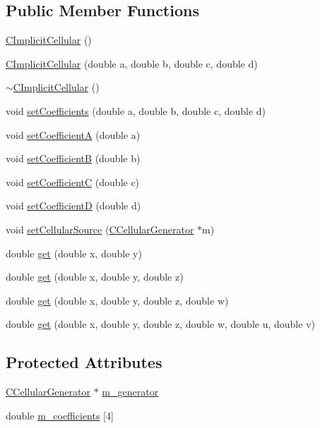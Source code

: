 \subsection*{Public Member Functions}
\begin{DoxyCompactItemize}
\item 
\hyperlink{classanl_1_1CImplicitCellular_a25da8b1ecdb5396f6e741bab08565b69}{CImplicitCellular} ()
\item 
\hyperlink{classanl_1_1CImplicitCellular_a1e754952ba8e132d394cfc2fa87dc048}{CImplicitCellular} (double a, double b, double c, double d)
\item 
\hyperlink{classanl_1_1CImplicitCellular_a59210b37300b9e5849e73ec834d21bc6}{$\sim$CImplicitCellular} ()
\item 
void \hyperlink{classanl_1_1CImplicitCellular_a7e73cf42aaaa4938e9b945beddee0357}{setCoefficients} (double a, double b, double c, double d)
\item 
void \hyperlink{classanl_1_1CImplicitCellular_a1ae398cefbc7591dc9848018aafd74f6}{setCoefficientA} (double a)
\item 
void \hyperlink{classanl_1_1CImplicitCellular_a3edf13d700a3855f1b40ad49e558a21e}{setCoefficientB} (double b)
\item 
void \hyperlink{classanl_1_1CImplicitCellular_aaf72b746ca8369b452c40a47d308415e}{setCoefficientC} (double c)
\item 
void \hyperlink{classanl_1_1CImplicitCellular_a6eeb2636ccb962cc1ff94f83dc53c8be}{setCoefficientD} (double d)
\item 
void \hyperlink{classanl_1_1CImplicitCellular_a646bdd9bebf686f8205b1da6d643a26c}{setCellularSource} (\hyperlink{classanl_1_1CCellularGenerator}{CCellularGenerator} $\ast$m)
\item 
double \hyperlink{classanl_1_1CImplicitCellular_aefb6e04efeb573a51112f1f27edef569}{get} (double x, double y)
\item 
double \hyperlink{classanl_1_1CImplicitCellular_aefaad448623f73921542503bc6ef898a}{get} (double x, double y, double z)
\item 
double \hyperlink{classanl_1_1CImplicitCellular_aaa7f9b16d76ba2fd6e8c1105ea76ba1e}{get} (double x, double y, double z, double w)
\item 
double \hyperlink{classanl_1_1CImplicitCellular_a0d5bebde497611f47083b97220ecffef}{get} (double x, double y, double z, double w, double u, double v)
\end{DoxyCompactItemize}
\subsection*{Protected Attributes}
\begin{DoxyCompactItemize}
\item 
\hyperlink{classanl_1_1CCellularGenerator}{CCellularGenerator} $\ast$ \hyperlink{classanl_1_1CImplicitCellular_a25b5b6d512c620bad24984dc9d029025}{m\_\-generator}
\item 
double \hyperlink{classanl_1_1CImplicitCellular_a2f6d1025eb62a88ab180eeed0a32268b}{m\_\-coefficients} \mbox{[}4\mbox{]}
\end{DoxyCompactItemize}


